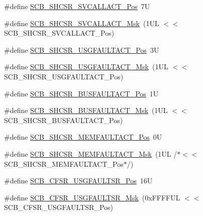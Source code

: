 \begin{DoxyCompactItemize}
\item 
\#define \hyperlink{group___c_m_s_i_s___s_c_b_ga977f5176be2bc8b123873861b38bc02f}{S\+C\+B\+\_\+\+S\+H\+C\+S\+R\+\_\+\+S\+V\+C\+A\+L\+L\+A\+C\+T\+\_\+\+Pos}~7U
\item 
\#define \hyperlink{group___c_m_s_i_s___s_c_b_ga634c0f69a233475289023ae5cb158fdf}{S\+C\+B\+\_\+\+S\+H\+C\+S\+R\+\_\+\+S\+V\+C\+A\+L\+L\+A\+C\+T\+\_\+\+Msk}~(1\+U\+L $<$$<$ S\+C\+B\+\_\+\+S\+H\+C\+S\+R\+\_\+\+S\+V\+C\+A\+L\+L\+A\+C\+T\+\_\+\+Pos)
\item 
\#define \hyperlink{group___c_m_s_i_s___s_c_b_gae06f54f5081f01ed3f6824e451ad3656}{S\+C\+B\+\_\+\+S\+H\+C\+S\+R\+\_\+\+U\+S\+G\+F\+A\+U\+L\+T\+A\+C\+T\+\_\+\+Pos}~3U
\item 
\#define \hyperlink{group___c_m_s_i_s___s_c_b_gab3166103b5a5f7931d0df90949c47dfe}{S\+C\+B\+\_\+\+S\+H\+C\+S\+R\+\_\+\+U\+S\+G\+F\+A\+U\+L\+T\+A\+C\+T\+\_\+\+Msk}~(1\+U\+L $<$$<$ S\+C\+B\+\_\+\+S\+H\+C\+S\+R\+\_\+\+U\+S\+G\+F\+A\+U\+L\+T\+A\+C\+T\+\_\+\+Pos)
\item 
\#define \hyperlink{group___c_m_s_i_s___s_c_b_gaf272760f2df9ecdd8a5fbbd65c0b767a}{S\+C\+B\+\_\+\+S\+H\+C\+S\+R\+\_\+\+B\+U\+S\+F\+A\+U\+L\+T\+A\+C\+T\+\_\+\+Pos}~1U
\item 
\#define \hyperlink{group___c_m_s_i_s___s_c_b_ga9d7a8b1054b655ad08d85c3c535d4f73}{S\+C\+B\+\_\+\+S\+H\+C\+S\+R\+\_\+\+B\+U\+S\+F\+A\+U\+L\+T\+A\+C\+T\+\_\+\+Msk}~(1\+U\+L $<$$<$ S\+C\+B\+\_\+\+S\+H\+C\+S\+R\+\_\+\+B\+U\+S\+F\+A\+U\+L\+T\+A\+C\+T\+\_\+\+Pos)
\item 
\#define \hyperlink{group___c_m_s_i_s___s_c_b_ga7c856f79a75dcc1d1517b19a67691803}{S\+C\+B\+\_\+\+S\+H\+C\+S\+R\+\_\+\+M\+E\+M\+F\+A\+U\+L\+T\+A\+C\+T\+\_\+\+Pos}~0U
\item 
\#define \hyperlink{group___c_m_s_i_s___s_c_b_ga9147fd4e1b12394ae26eadf900a023a3}{S\+C\+B\+\_\+\+S\+H\+C\+S\+R\+\_\+\+M\+E\+M\+F\+A\+U\+L\+T\+A\+C\+T\+\_\+\+Msk}~(1\+U\+L /$\ast$$<$$<$ S\+C\+B\+\_\+\+S\+H\+C\+S\+R\+\_\+\+M\+E\+M\+F\+A\+U\+L\+T\+A\+C\+T\+\_\+\+Pos$\ast$/)
\item 
\#define \hyperlink{group___c_m_s_i_s___s_c_b_gac8e4197b295c8560e68e2d71285c7879}{S\+C\+B\+\_\+\+C\+F\+S\+R\+\_\+\+U\+S\+G\+F\+A\+U\+L\+T\+S\+R\+\_\+\+Pos}~16U
\item 
\#define \hyperlink{group___c_m_s_i_s___s_c_b_ga565807b1a3f31891f1f967d0fa30d03f}{S\+C\+B\+\_\+\+C\+F\+S\+R\+\_\+\+U\+S\+G\+F\+A\+U\+L\+T\+S\+R\+\_\+\+Msk}~(0x\+F\+F\+F\+F\+U\+L $<$$<$ S\+C\+B\+\_\+\+C\+F\+S\+R\+\_\+\+U\+S\+G\+F\+A\+U\+L\+T\+S\+R\+\_\+\+Pos)
\item 

\end{DoxyCompactItemize}
